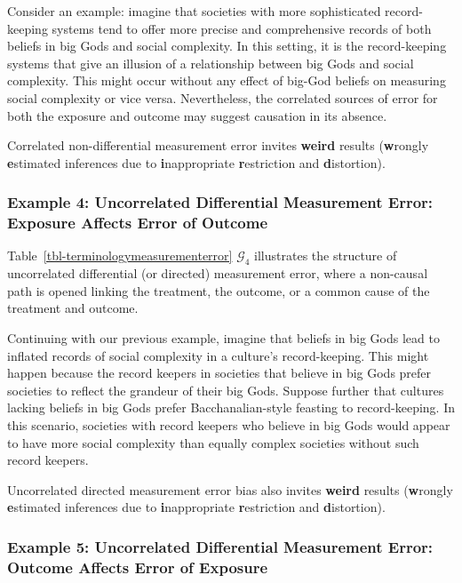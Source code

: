 \documentclass[
  single column]{article}
\begin{document}
Consider an example: imagine that societies with more sophisticated
record-keeping systems tend to offer more precise and comprehensive
records of both beliefs in big Gods and social complexity. In this
setting, it is the record-keeping systems that give an illusion of a
relationship between big Gods and social complexity. This might occur
without any effect of big-God beliefs on measuring social complexity or
vice versa. Nevertheless, the correlated sources of error for both the
exposure and outcome may suggest causation in its absence.

Correlated non-differential measurement error invites \textbf{weird}
results (\textbf{w}rongly \textbf{e}stimated inferences due to
\textbf{i}nappropriate \textbf{r}estriction and \textbf{d}istortion).

\subsubsection{Example 4: Uncorrelated Differential Measurement Error:
Exposure Affects Error of
Outcome}\label{example-4-uncorrelated-differential-measurement-error-exposure-affects-error-of-outcome}

Table~\ref{tbl-terminologymeasurementerror} \(\mathcal{G}_4\)
illustrates the structure of uncorrelated differential (or directed)
measurement error, where a non-causal path is opened linking the
treatment, the outcome, or a common cause of the treatment and outcome.

Continuing with our previous example, imagine that beliefs in big Gods
lead to inflated records of social complexity in a culture's
record-keeping. This might happen because the record keepers in
societies that believe in big Gods prefer societies to reflect the
grandeur of their big Gods. Suppose further that cultures lacking
beliefs in big Gods prefer Bacchanalian-style feasting to
record-keeping. In this scenario, societies with record keepers who
believe in big Gods would appear to have more social complexity than
equally complex societies without such record keepers.

Uncorrelated directed measurement error bias also invites \textbf{weird}
results (\textbf{w}rongly \textbf{e}stimated inferences due to
\textbf{i}nappropriate \textbf{r}estriction and \textbf{d}istortion).

\subsubsection{Example 5: Uncorrelated Differential Measurement Error:
Outcome Affects Error of
Exposure}\label{example-5-uncorrelated-differential-measurement-error-outcome-affects-error-of-exposure}
\end{document}
